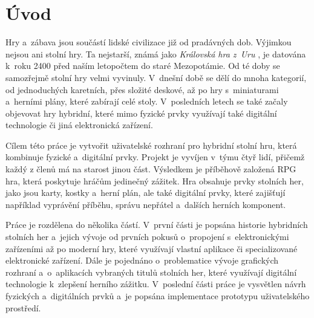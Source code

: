 \chapter{Úvod}
Hry a~zábava jsou součástí lidské civilizace již od pradávných dob. Výjimkou nejsou ani stolní hry. Ta nejstarší, známá jako \textit{Královská hra z~Uru} \cite{royal_game_of_ur}, je datována k~roku 2400 před naším letopočtem do staré Mezopotámie. Od té doby se samozřejmě stolní hry velmi vyvinuly. V~dnešní době se dělí do mnoha kategorií, od jednoduchých karetních, přes složité deskové, až po hry s~miniaturami a~herními plány, které zabírají celé stoly. V~posledních letech se také začaly objevovat hry hybridní, které mimo fyzické prvky využívají také digitální technologie či jiná elektronická zařízení.

Cílem této práce je vytvořit uživatelské rozhraní pro hybridní stolní hru, která kombinuje fyzické a~digitální prvky. Projekt je vyvíjen v~týmu čtyř lidí, přičemž každý z členů má na starost jinou část. Výsledkem je příběhově založená RPG hra, která poskytuje hráčům jedinečný zážitek. Hra obsahuje prvky stolních her, jako jsou karty, kostky a~herní plán, ale také digitální prvky, které zajišťují například vyprávění příběhu, správu nepřátel a~dalších herních komponent.

Práce je rozdělena do několika částí. V~první části je popsána historie hybridních stolních her a~jejich vývoje od prvních pokusů o~propojení s~elektronickými zařízeními až po moderní hry, které využívají vlastní aplikace či specializované elektronické zařízení. Dále je pojednáno o~problematice vývoje grafických rozhraní a~o~aplikacích vybraných titulů stolních her, které využívají digitální technologie k~zlepšení herního zážitku. V~poslední části práce je vysvětlen návrh fyzických a~digitálních prvků a~je popsána implementace prototypu uživatelského prostředí.